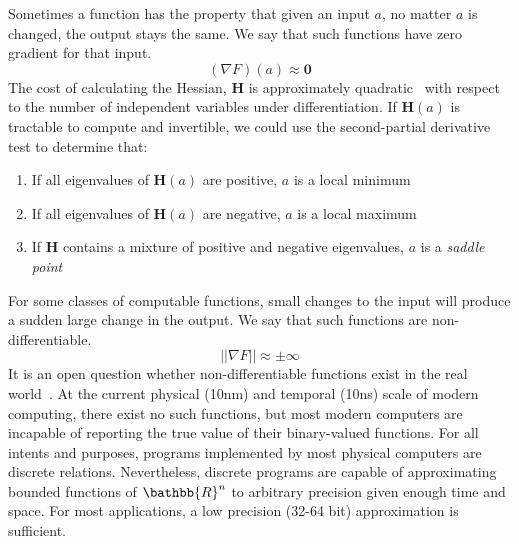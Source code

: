 \documentclass[12pt,initial,twoside,maitrise]{dms}
\numberwithin{equation}{section}
\numberwithin{table}{chapter}
\numberwithin{figure}{chapter}
\begin{document}
\noindent Sometimes a function has the property that given an input $a$, no matter $a$ is changed, the output stays the same. We say that such functions have zero gradient for that input.
%
\begin{equation}
    (\nabla F)(a) \approx \mathbf{0}
\end{equation}
%
The cost of calculating the Hessian, $\mathbf{H}$ is approximately quadratic~\citep{griewank1993some} with respect to the number of independent variables under differentiation. If $\mathbf{H}(a)$ is tractable to compute and invertible, we could use the second-partial derivative test to determine that:\\
%
\begin{enumerate}
    \item If all eigenvalues of $\mathbf{H}(a)$ are positive, $a$ is a local minimum
    \item If all eigenvalues of $\mathbf{H}(a)$ are negative, $a$ is a local maximum
    \item If $\mathbf{H}$ contains a mixture of positive and negative eigenvalues, $a$ is a \textit{saddle point}\\
\end{enumerate}
%
For some classes of computable functions, small changes to the input will produce a sudden large change in the output. We say that such functions are non-differentiable.
%
\begin{equation}
    ||\nabla F|| \approx \pm \infty
\end{equation}
%
It is an open question whether non-differentiable functions exist in the real world~\citep{buniy2005hilbert}. At the current physical (10nm) and temporal (10ns) scale of modern computing, there exist no such functions, but most modern computers are incapable of reporting the true value of their binary-valued functions. For all intents and purposes, programs implemented by most physical computers are discrete relations. Nevertheless, discrete programs are capable of approximating bounded functions of $\bathbb{R}^n$ to arbitrary precision given enough time and space. For most applications, a low precision (32-64 bit) approximation is sufficient.
\end{document}
